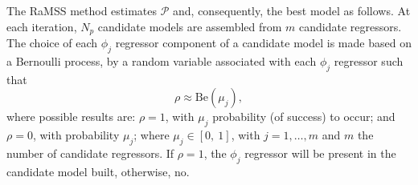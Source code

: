 The RaMSS method estimates $\mathcal{P}$ and, consequently, the best model as follows. At each iteration, $N_p$ candidate models are assembled from $m$ candidate regressors. The choice of each $\phi_j$ regressor component of a candidate model is made based on a Bernoulli process, by a random variable associated with each $\phi_j$ regressor such that
\begin{equation}
   \rho \approx \text{Be}(\mu_j),
\label{eq:bernulli}
\end{equation}
where possible results are: $\rho=1$, with $\mu_j$ probability (of success) to occur; and $\rho=0$, with probability $\mu_j$; where $\mu_j \in [0,\ 1]$, with $ j=1, \dots, m$ and $m$ the number of candidate regressors.
If $\rho=1$, the $\phi_j$ regressor will be present in the candidate model built, otherwise, no.

